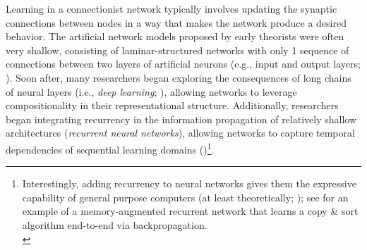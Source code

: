 \documentclass[12pt]{article}
\let\oldcite=\cite
\let\oldtextcite=\textcite
\renewcommand{\cite}[1]{\textcolor[rgb]{0, .121, .388}{\oldcite{#1}}}
\renewcommand{\textcite}[1]{\textcolor[rgb]{0, .121, .388}{\oldtextcite{#1}}}
\begin{document}
Learning in a connectionist network typically involves updating the synaptic connections between nodes in a way that makes the network produce a desired behavior. The artificial network models proposed by early theorists were often very shallow, consisting of laminar-structured networks with only 1 sequence of connections between two layers of artificial neurons (e.g., input and output layers; \cite{rosenblatt1958perceptron,schmidhuber2015deep}). Soon after, many researchers began exploring the consequences of long chains of neural layers (i.e., \emph{deep learning}; \cite{ivakhnenko1965cybernetic,lecun1989backpropagation,lecun1995convolutional}), allowing networks to leverage compositionality in their representational structure. Additionally, researchers began integrating recurrency in the information propagation of relatively shallow architectures (\emph{recurrent neural networks}), allowing networks to capture temporal dependencies of sequential learning domains (\cite{jordan1990attractor,hochreiter1997long})\footnote{Interestingly, adding recurrency to neural networks gives them the expressive capability of general purpose computers (at least theoretically; \cite{schmidhuber2015deep}); see \textcite{graves2014neural} for an example of a memory-augmented recurrent network that learns a copy \& sort algorithm end-to-end via backpropagation. \\}. 
\end{document}
